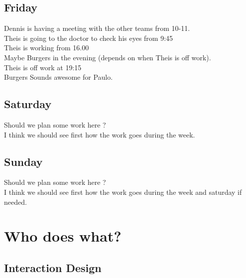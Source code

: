 \documentclass[10pt,a4paper]{article}
\begin{document}
\subsection{Friday}
Dennis is having a meeting with the other teams from 10-11.
\\ Theis is going to the doctor to check his eyes from 9:45
\\ Theis is working from 16.00
\\ Maybe Burgers in the evening (depends on when Theis is off work).
\\ Theis is off work at 19:15
\\ Burgers Sounds awesome for Paulo.
\subsection{Saturday}
Should we plan some work here ?\\
I think we should see first how the work goes during the week.\\
\subsection{Sunday}
Should we plan some work here ?\\
I think we should see first how the work goes during the week and saturday if needed.\\

\section{Who does what?}
\subsection{Interaction Design}
\end{document}
